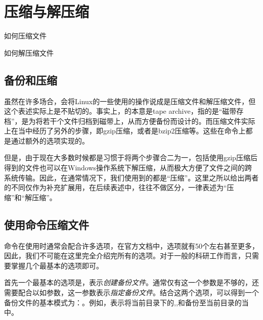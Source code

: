 \section{压缩与解压缩}\label{sec:压缩与解压缩}

\begin{Abstract}
    \item 如何压缩文件
    \item 如何解压缩文件
\end{Abstract}


\subsection{备份和压缩}\label{subsec:压缩与解压缩-备份和压缩}

\begin{extend}
    虽然在许多场合，会将Linux的一些使用的操作说成是压缩文件和解压缩文件，但这个表述实际上是不贴切的。事实上，的本意是tape archive，指的是“磁带存档”，是为将若干个文件归档到磁带上，从而方便备份而设计的。而压缩文件实际上在当中经历了另外的步骤，即gzip压缩，或者是bzip2压缩等。这些在命令上都是通过额外的选项实现的。

    但是，由于现在大多数时候都是习惯于将两个步骤合二为一，包括使用gzip压缩后得到的文件也可以在Windows操作系统下解压缩，从而极大方便了文件之间的跨系统传输。因此，在通常情况下，我们使用到的都是“压缩”。这里之所以给出两者的不同仅作为补充扩展用，在后续表述中，往往不做区分，一律表述为“压缩”和“解压缩”。
\end{extend}

\subsection{使用命令压缩文件}\label{subsec:压缩与解压缩-使用tar命令压缩文件}

命令在使用时通常会配合许多选项，在官方文档中，选项就有50个左右甚至更多，因此，我们不可能在这里完全介绍完所有的选项。对于一般的科研工作而言，只需要掌握几个最基本的选项即可。

首先一个最基本的选项是，表示\emph{创建备份文件}。通常仅有这一个参数是不够的，还需要配合以如参数，这一参数表示\emph{指定备份文件}。结合这两个选项，可以得到一个备份文件的基本模式为：。例如，表示将当前目录下的,,和备份至当前目录的当中。

